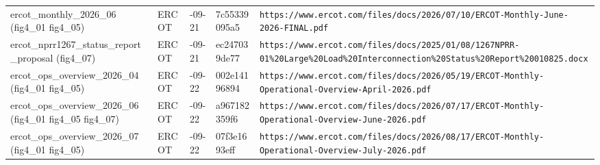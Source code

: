 \begin{longtable}{>{\raggedright\arraybackslash}p{3.0cm}>{\raggedright\arraybackslash}p{1.5cm}>{\raggedright\arraybackslash}p{1.4cm}>{\raggedright\arraybackslash}p{2.0cm}>{\raggedright\arraybackslash}p{6.0cm}}
ercot\_\allowbreak{}monthly\_\allowbreak{}2026\_\allowbreak{}06 (fig4\_\allowbreak{}01 fig4\_\allowbreak{}05) & ERCOT & 2026-09-21 & 7c55339095a5 & \texttt{https:\allowbreak{}/\allowbreak{}/\allowbreak{}www.\allowbreak{}ercot.\allowbreak{}com/\allowbreak{}files/\allowbreak{}docs/\allowbreak{}2026/\allowbreak{}07/\allowbreak{}10/\allowbreak{}ERCOT-\allowbreak{}Monthly-\allowbreak{}June-\allowbreak{}2026-\allowbreak{}FINAL.\allowbreak{}pdf} \\
ercot\_\allowbreak{}nprr1267\_\allowbreak{}status\_\allowbreak{}report\_\allowbreak{}proposal (fig4\_\allowbreak{}07) & ERCOT & 2026-09-21 & ec247039de77 & \texttt{https:\allowbreak{}/\allowbreak{}/\allowbreak{}www.\allowbreak{}ercot.\allowbreak{}com/\allowbreak{}files/\allowbreak{}docs/\allowbreak{}2025/\allowbreak{}01/\allowbreak{}08/\allowbreak{}1267NPRR-\allowbreak{}01\%\allowbreak{}20Large\%\allowbreak{}20Load\%\allowbreak{}20Interconnection\%\allowbreak{}20Status\%\allowbreak{}20Report\%\allowbreak{}20010825.\allowbreak{}docx} \\
ercot\_\allowbreak{}ops\_\allowbreak{}overview\_\allowbreak{}2026\_\allowbreak{}04 (fig4\_\allowbreak{}01 fig4\_\allowbreak{}05) & ERCOT & 2026-09-22 & 002e14196894 & \texttt{https:\allowbreak{}/\allowbreak{}/\allowbreak{}www.\allowbreak{}ercot.\allowbreak{}com/\allowbreak{}files/\allowbreak{}docs/\allowbreak{}2026/\allowbreak{}05/\allowbreak{}19/\allowbreak{}ERCOT-\allowbreak{}Monthly-\allowbreak{}Operational-\allowbreak{}Overview-\allowbreak{}April-\allowbreak{}2026.\allowbreak{}pdf} \\
ercot\_\allowbreak{}ops\_\allowbreak{}overview\_\allowbreak{}2026\_\allowbreak{}06 (fig4\_\allowbreak{}01 fig4\_\allowbreak{}05 fig4\_\allowbreak{}07) & ERCOT & 2026-09-22 & a967182359f6 & \texttt{https:\allowbreak{}/\allowbreak{}/\allowbreak{}www.\allowbreak{}ercot.\allowbreak{}com/\allowbreak{}files/\allowbreak{}docs/\allowbreak{}2026/\allowbreak{}07/\allowbreak{}17/\allowbreak{}ERCOT-\allowbreak{}Monthly-\allowbreak{}Operational-\allowbreak{}Overview-\allowbreak{}June-\allowbreak{}2026.\allowbreak{}pdf} \\
ercot\_\allowbreak{}ops\_\allowbreak{}overview\_\allowbreak{}2026\_\allowbreak{}07 (fig4\_\allowbreak{}01 fig4\_\allowbreak{}05) & ERCOT & 2026-09-22 & 07f3e1693eff & \texttt{https:\allowbreak{}/\allowbreak{}/\allowbreak{}www.\allowbreak{}ercot.\allowbreak{}com/\allowbreak{}files/\allowbreak{}docs/\allowbreak{}2026/\allowbreak{}08/\allowbreak{}17/\allowbreak{}ERCOT-\allowbreak{}Monthly-\allowbreak{}Operational-\allowbreak{}Overview-\allowbreak{}July-\allowbreak{}2026.\allowbreak{}pdf} \\

\end{longtable}
